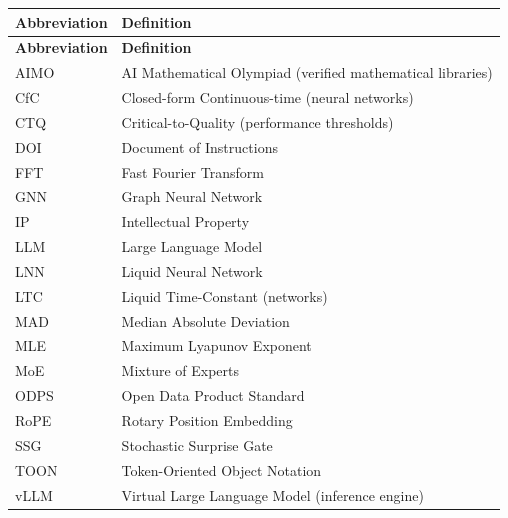 \begin{longtable}{@{}p{3cm}p{10cm}@{}}
\toprule
\textbf{Abbreviation} & \textbf{Definition} \\
\midrule
\endfirsthead
\toprule
\textbf{Abbreviation} & \textbf{Definition} \\
\midrule
\endhead
\bottomrule
\endlastfoot

AIMO & AI Mathematical Olympiad (verified mathematical libraries) \\
CfC & Closed-form Continuous-time (neural networks) \\
CTQ & Critical-to-Quality (performance thresholds) \\
DOI & Document of Instructions \\
FFT & Fast Fourier Transform \\
GNN & Graph Neural Network \\
IP & Intellectual Property \\
LLM & Large Language Model \\
LNN & Liquid Neural Network \\
LTC & Liquid Time-Constant (networks) \\
MAD & Median Absolute Deviation \\
MLE & Maximum Lyapunov Exponent \\
MoE & Mixture of Experts \\
ODPS & Open Data Product Standard \\
RoPE & Rotary Position Embedding \\
SSG & Stochastic Surprise Gate \\
TOON & Token-Oriented Object Notation \\
vLLM & Virtual Large Language Model (inference engine) \\

\end{longtable}

\newpage